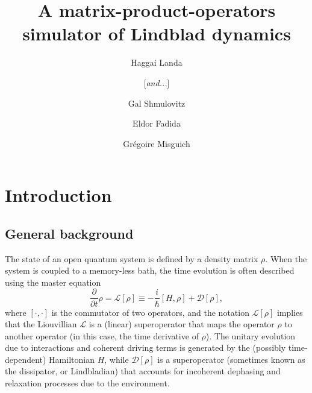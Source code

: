 \documentclass[aps,10pt,pra,twocolumn,groupedaddress,floatfix,superscriptaddress,showpacs,showkeys,amsfonts]{revtex4-2}
\newcommand{\be}{\begin{equation}}
\newcommand{\ee}{\end{equation}}
\begin{document}
\title{A matrix-product-operators simulator of Lindblad dynamics}

\author{Haggai Landa}
\author{[{\it and...}]}
\author{Gal Shmulovitz}\author{Eldor Fadida}
\author{Grégoire Misguich}

\begin{abstract}
\end{abstract}

\maketitle

\section{Introduction}\label{Sec:Intro}
 
\subsection{General background}\label{Sec:Background}

The state of an open quantum system is defined by a density matrix $\rho$. When the system is coupled to a memory-less bath, the time evolution is often described using the master equation
\be
\frac{\partial}{\partial t}\rho = \mathcal{L}[\rho]\equiv -\frac{i}{\hbar}[H,\rho]+\mathcal{D}[\rho],\label{Eq:dtrho}
\ee
where $[\cdot,\cdot]$ is the commutator of two operators, and the notation $\mathcal{L}[\rho]$ implies that the Liouvillian $\mathcal{L}$ is a (linear) superoperator that maps the operator $\rho$ to another operator (in this case, the time derivative of $\rho$). The unitary evolution due to interactions and coherent driving terms is generated by the  (possibly time-dependent) Hamiltonian $H$, while $\mathcal{D}[\rho]$ is a superoperator (sometimes known as the 
dissipator, or Lindbladian) that accounts for incoherent dephasing and relaxation processes due to the environment. 

\end{document}
